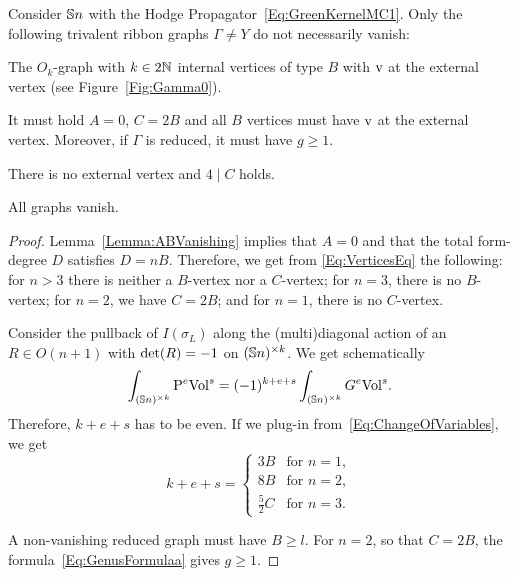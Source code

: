 \documentclass[\MainFolder/Text.tex]{subfiles}
\begin{document}
\begin{Proposition} \label{Prop:TotalVanishing}
Consider $\mathbb{S}{n}$ with the Hodge Propagator~\eqref{Eq:GreenKernelMC1}. Only the following trivalent ribbon graphs $\Gamma \neq Y$ do not necessarily vanish:
\begin{description}[font=\normalfont\itshape]
 \item[($n=1$):] The $O_{k}$-graph with $k\in 2\mathbb{N}$ internal vertices of type $B$ with $\mathrm{v}$ at the external vertex (see Figure~\ref{Fig:Gamma0}).
 \item[($n=2$):] It must hold $A=0$, $C=2B$ and all $B$ vertices must have $\mathrm{v}$ at the external vertex. Moreover, if $\Gamma$ is reduced, it must have $g\ge 1$.
 \item[($n=3$):] There is no external vertex and $4 \mid C$ holds.
 \item[($n>3$):] All graphs vanish.
\end{description}
\end{Proposition}
\begin{proof}
Lemma~\ref{Lemma:ABVanishing} implies that $A=0$ and that the total form-degree $D$ satisfies $D= n B$. Therefore, we get from \eqref{Eq:VerticesEq} the following: for $n>3$ there is neither a $B$-vertex nor a $C$-vertex; for $n=3$, there is no $B$-vertex; for $n=2$, we have $C=2B$; and for $n=1$, there is no $C$-vertex.

Consider the pullback of $I(\sigma_L)$ along the (multi)diagonal action of an $R\in O(n+1)$ with $\operatorname{det}(R)=-1$ on $(\mathbb{S}{n})^{\times k}$. We get schematically
$$ \int_{(\mathbb{S}{n})^{\times k}} \mathrm{P}^{e}\mathrm{Vol}^{s} = (-1)^{k +e + s} \int_{(\mathbb{S}{n})^{\times k}} G^{e}\mathrm{Vol}^{s}. $$
Therefore, $k+ e + s$ has to be even. If we plug-in from~\eqref{Eq:ChangeOfVariables}, we get
$$ k+ e + s =  \begin{cases}
3 B & \text{for }n=1, \\
8 B & \text{for }n=2, \\
\frac{5}{2} C & \text{for }n=3.
\end{cases} $$

A non-vanishing reduced graph must have $B\ge l$. For $n=2$, so that $C=2B$, the formula~\eqref{Eq:GenusFormulaa} gives $g\ge 1$.
\end{proof}
\end{document}
